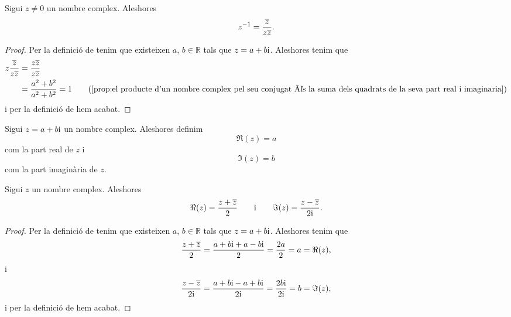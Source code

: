 \documentclass[../../Main.tex]{subfiles}
\begin{document}
	\begin{proposition}
		\label{prop:inversa d'un nombre complex en funció del seu conjugat}
		Sigui \(z\neq0\) un nombre complex. Aleshores
		\[z^{-1}=\frac{\overline{z}}{z\overline{z}}.\]
		\begin{proof}
			Per la definició de  tenim que existeixen \(a\), \(b\in\mathbb{R}\) tals que \(z=a+b\mathrm{i}\). Aleshores tenim que
			\begin{align*}
				z\frac{\conjugat{z}}{z\conjugat{z}}&=\frac{z\conjugat{z}}{z\conjugat{z}} \\
				&=\frac{a^{2}+b^{2}}{a^{2}+b^{2}}=1 \tag{\ref{prop:el producte d'un nombre complex pel seu conjugat és la suma dels quadrats de la seva part real i imaginaria}}
			\end{align*}
			i per la definició de  hem acabat.
		\end{proof}
	\end{proposition}
	\begin{definition}
		\label{def:part real i part imaginària d'un nombre complex}
		\label{def:part real d'un nombre complex}
		\label{def:part imaginària d'un nombre complex}
		Sigui \(z=a+b\mathrm{i}\) un nombre complex. Aleshores definim
		\[\Re(z)=a\]
		com la part real de \(z\) i
		\[\Im(z)=b\]
		com la part imaginària de \(z\).
	\end{definition}
	\begin{proposition}
		\label{prop:fórmules per la part real i part imaginària d'un nombre complex}
		\label{prop:fórmula per la part real d'un nombre complex}
		\label{prop:fórmula per la part imaginària d'un nombre complex}
		Sigui \(z\) un nombre complex. Aleshores
		\[\Re(z)=\frac{z+\overline{z}}{2}\qquad\text{i}\qquad\Im(z)=\frac{z-\overline{z}}{2\mathrm{i}}.\]
		\begin{proof}
			Per la definició de  tenim que existeixen \(a\), \(b\in\mathbb{R}\) tals que \(z=a+b\mathrm{i}\). Aleshores tenim que
			\[\frac{z+\overline{z}}{2}=\frac{a+b\mathrm{i}+a-b\mathrm{i}}{2}=\frac{2a}{2}=a=\Re(z),\]
			i
			\[\frac{z-\overline{z}}{2\mathrm{i}}=\frac{a+b\mathrm{i}-a+b\mathrm{i}}{2\mathrm{i}}=\frac{2b\mathrm{i}}{2\mathrm{i}}=b=\Im(z),\]
			i per la definició de  hem acabat.
		\end{proof}
	\end{proposition}
\end{document}
